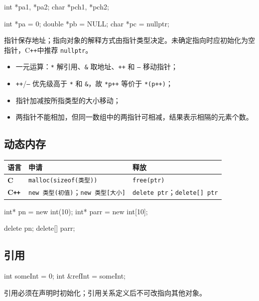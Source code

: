 \documentclass[UTF8,fontset=fandol,zihao=5]{ctexart}
\newcommand{\code}[1]{\texttt{#1}}
\newcommand{\cpp}{C\texttt{++}}
\begin{document}
\begin{cppcode}[声明与初始化]
int *pa1, *pa2;
char *pch1, *pch2;

int *pa = 0;
double *pb = NULL;
char *pc = nullptr;
\end{cppcode}

指针保存地址；指向对象的解释方式由指针类型决定。未确定指向时应初始化为空指针，\cpp 中推荐 \code{nullptr}。

\begin{itemize}
  \item 一元运算：\code{*} 解引用、\code{\&} 取地址、\code{++} 和 \code{--} 移动指针；
  \item \code{++}/\code{--} 优先级高于 \code{*} 和 \code{\&}，故 \code{*p++} 等价于 \code{*(p++)}；
  \item 指针加减按所指类型的大小移动；
  \item 两指针不能相加，但同一数组中的两指针可相减，结果表示相隔的元素个数。
\end{itemize}

\subsection{动态内存}

\begin{center}
\begin{tabularx}{0.94\textwidth}{>{\bfseries}p{2.2cm}X X}
\toprule
语言 & 申请 & 释放 \\
\midrule
C & \code{malloc(sizeof(类型))} & \code{free(ptr)} \\
\cpp & \code{new 类型(初值)}；\code{new 类型[大小]} & \code{delete ptr}；\code{delete[] ptr} \\
\bottomrule
\end{tabularx}
\end{center}

\begin{cppcode}[动态内存]
int* pn = new int(10);
int* parr = new int[10];

delete pn;
delete[] parr;
\end{cppcode}

\subsection{引用}

\begin{cppcode}[引用]
int someInt = 0;
int &refInt = someInt;
\end{cppcode}

引用必须在声明时初始化；引用关系定义后不可改指向其他对象。
\end{document}
